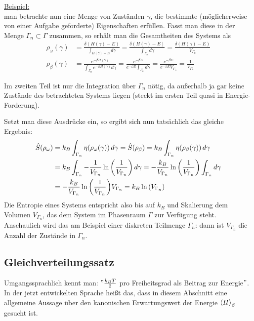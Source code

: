 \documentclass[../KlassMech_main.tex]{subfiles}
\begin{document}
\underline{Beispiel:}\\
man betrachte nun eine Menge von Zuständen $\gamma$, die bestimmte (möglicherweise von einer Aufgabe geforderte) Eigenschaften erfüllen. Fasst man diese in der Menge $\Gamma_n \subset \Gamma$ zusammen, so erhält man die Gesamtheiten des Systems als
\begin{align}\label{key}
\rho_\omega(\gamma) &= \frac{\delta(H(\gamma) - E)}{\int_{H(\gamma) = E} d\gamma} = \frac{\delta(H(\gamma) - E)}{\int_{\Gamma_n} d\gamma} = \frac{\delta(H(\gamma) - E)}{V_{\Gamma_n}}
\\
\rho_\beta(\gamma) &= \frac{e^{-\beta H(\gamma)}}{\int_{\Gamma_n} e^{-\beta H(\gamma)} d\gamma} = \frac{e^{-\beta E}}{e^{-\beta E} \int_{\Gamma_n} d\gamma} = \frac{e^{-\beta E}}{e^{-\beta E} V_{\Gamma_n}} = \frac{1}{V_{\Gamma_n}}
\end{align}

Im zweiten Teil ist nur die Integration über $\Gamma_n$ nötig, da außerhalb ja gar keine Zustände des betrachteten Systems liegen (steckt im ersten Teil quasi in Energie-Forderung).

Setzt man diese Ausdrücke ein, so ergibt sich nun tatsächlich das gleiche Ergebnis:
\begin{align}\label{key}
\hat{S}(\rho_\omega) &= k_B \int_{\Gamma_n} \eta\qty(\rho_\omega(\gamma)) \, d\gamma = \hat{S}(\rho_\beta) = k_B \int_{\Gamma_n} \eta\qty(\rho_\beta(\gamma)) \, d\gamma
\notag\\
&= k_B \int_{\Gamma_n} -\frac{1}{V_{\Gamma_n}} \ln\qty(\frac{1}{V_{\Gamma_n}}) \, d\gamma = -\frac{k_B}{V_{\Gamma_n}} \ln\qty(\frac{1}{V_{\Gamma_n}}) \int_{\Gamma_n} d\gamma
\notag\\
&= -\frac{k_B}{V_{\Gamma_n}} \ln\qty(\frac{1}{V_{\Gamma_n}}) V_{\Gamma_n} = k_B \ln\qty(V_{\Gamma_n})
\end{align}
Die Entropie eines Systems entspricht also bis auf $k_B$ und Skalierung dem Volumen $V_{\Gamma_n}$, das dem System im Phasenraum $\Gamma$ zur Verfügung steht. Anschaulich wird das am Beispiel einer diskreten Teilmenge $\Gamma_n$: dann ist $V_{\Gamma_n}$ die Anzahl der Zustände in $\Gamma_n$.



	\subsection{Gleichverteilungssatz}
Umgangssprachlich kennt man: $" \frac{k_B T}{2}$ pro Freiheitsgrad als Beitrag zur Energie$"$.\\
In der jetzt entwickelten Sprache heißt das, dass in diesem Abschnitt eine allgemeine Aussage über den kanonischen Erwartungswert der Energie $\expval{H}_\beta$ gesucht ist.
\end{document}
